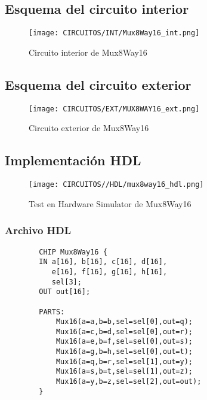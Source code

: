 \documentclass[12pt]{article}
\begin{document}
    \subsection{Esquema del circuito interior}
        \begin{figure}[H]
            \centering
            \texttt{[image: CIRCUITOS/INT/Mux8Way16\_int.png]}            \caption{Circuito interior de Mux8Way16 \cite{circuitverse}}
            \label{fig:mux8way16_int}
        \end{figure}
    \subsection{Esquema del circuito exterior}
        \begin{figure}[H]
            \centering
            \texttt{[image: CIRCUITOS/EXT/MUX8WAY16\_ext.png]}            
            \caption{Circuito exterior de Mux8Way16 \cite{circuitverse}}
            \label{fig:mux8way16_ext}
        \end{figure}
    \subsection{Implementación HDL}
        \begin{figure}[H]
            \centering
            \texttt{[image: CIRCUITOS//HDL/mux8way16\_hdl.png]}
            \caption{Test en Hardware Simulator de Mux8Way16 \cite{nand2tetris}}
            \label{fig:hdlmux8way16}
        \end{figure}
        \subsubsection{Archivo HDL}
            \begin{lstlisting}
        CHIP Mux8Way16 {
        IN a[16], b[16], c[16], d[16],
           e[16], f[16], g[16], h[16],
           sel[3];
        OUT out[16];
    
        PARTS:
            Mux16(a=a,b=b,sel=sel[0],out=q); 
            Mux16(a=c,b=d,sel=sel[0],out=r);
            Mux16(a=e,b=f,sel=sel[0],out=s); 
            Mux16(a=g,b=h,sel=sel[0],out=t);
            Mux16(a=q,b=r,sel=sel[1],out=y);
            Mux16(a=s,b=t,sel=sel[1],out=z);
            Mux16(a=y,b=z,sel=sel[2],out=out);
        }
            \end{lstlisting}
    \newpage


\end{document}
